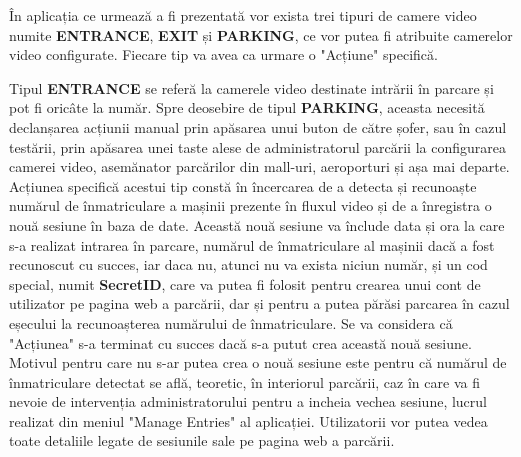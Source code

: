 \documentclass[12pt]{article}
\begin{document}
\^{I}n aplicația ce urmeaz\u{a} a fi prezentat\u{a} vor exista trei tipuri de camere video numite \textbf{ENTRANCE}, \textbf{EXIT} și \textbf{PARKING}, ce vor putea fi atribuite camerelor video configurate. Fiecare tip va avea ca urmare o "Acțiune" specific\u{a}.

Tipul \textbf{ENTRANCE} se refer\u{a} la camerele video destinate intr\u{a}rii \^{i}n parcare și pot fi oric\^{a}te la num\u{a}r. Spre deosebire de tipul \textbf{PARKING}, aceasta necesit\u{a} declanșarea acțiunii manual prin ap\u{a}sarea unui buton de c\u{a}tre șofer, sau \^{i}n cazul test\u{a}rii, prin ap\u{a}sarea unei taste alese de administratorul parc\u{a}rii la configurarea camerei video, asem\u{a}nator parc\u{a}rilor din mall-uri, aeroporturi și așa mai departe. Acțiunea specific\u{a} acestui tip const\u{a} \^{i}n \^{i}ncercarea de a detecta și recunoaște num\u{a}rul de \^{i}nmatriculare a mașinii prezente \^{i}n fluxul video și de a \^{i}nregistra o nou\u{a} sesiune \^{i}n baza de date. Aceast\u{a} nou\u{a} sesiune va \^{i}nclude data și ora la care s-a realizat intrarea \^{i}n parcare, num\u{a}rul de \^{i}nmatriculare al mașinii dac\u{a} a fost recunoscut cu succes, iar daca nu, atunci nu va exista niciun num\u{a}r, și un cod special, numit \textbf{SecretID}, care va putea fi folosit pentru crearea unui cont de utilizator pe pagina web a parc\u{a}rii, dar și pentru a putea p\u{a}r\u{a}si parcarea \^{i}n cazul eșecului la recunoașterea num\u{a}rului de \^{i}nmatriculare. Se va considera c\u{a} "Acțiunea" s-a terminat cu succes dac\u{a} s-a putut crea aceast\u{a} nou\u{a} sesiune. Motivul pentru care nu s-ar putea crea o nou\u{a} sesiune este pentru c\u{a} num\u{a}rul de \^{i}nmatriculare detectat se afl\u{a}, teoretic, \^{i}n interiorul parc\u{a}rii, caz \^{i}n care va fi nevoie de intervenția administratorului pentru a incheia vechea sesiune, lucrul realizat din meniul "Manage Entries" al aplicației. Utilizatorii vor putea vedea toate detaliile legate de sesiunile sale pe pagina web a parc\u{a}rii.
\end{document}
